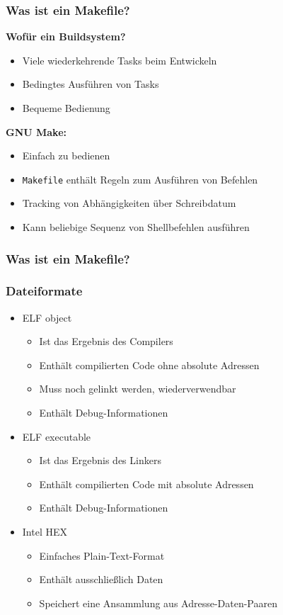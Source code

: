 \documentclass{beamer}
\begin{document}
\begin{frame}
\frametitle{Was ist ein Makefile?}
\textbf{Wofür ein Buildsystem?}
\begin{itemize}
\item Viele wiederkehrende Tasks beim Entwickeln
\item Bedingtes Ausführen von Tasks
\item Bequeme Bedienung
\end{itemize}

\textbf{GNU Make:}
\begin{itemize}
\item Einfach zu bedienen
\item \lstinline{Makefile} enthält Regeln zum Ausführen von Befehlen
\item Tracking von Abhängigkeiten über Schreibdatum
\item Kann beliebige Sequenz von Shellbefehlen ausführen
\end{itemize}
\end{frame}

\begin{frame}
\frametitle{Was ist ein Makefile?}

\end{frame}

\begin{frame}
\frametitle{Dateiformate}
\begin{itemize}
\item ELF object
    \begin{itemize}
    \item Ist das Ergebnis des Compilers
    \item Enthält compilierten Code ohne absolute Adressen
    \item Muss noch gelinkt werden, wiederverwendbar
    \item Enthält Debug-Informationen
    \end{itemize}
\item ELF executable
    \begin{itemize}
    \item Ist das Ergebnis des Linkers
    \item Enthält compilierten Code mit absolute Adressen
    \item Enthält Debug-Informationen
    \end{itemize}
\item Intel HEX
    \begin{itemize}
    \item Einfaches Plain-Text-Format
    \item Enthält ausschließlich Daten
    \item Speichert eine Ansammlung aus Adresse-Daten-Paaren
    \end{itemize}
\end{itemize}
\end{frame}
\end{document}
